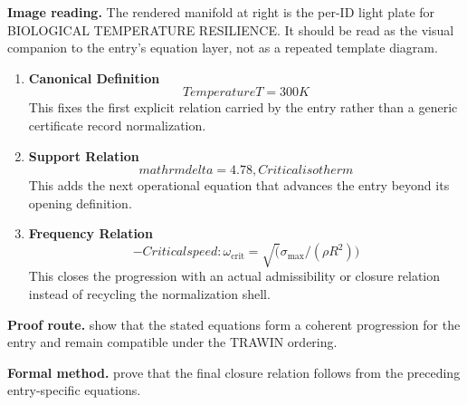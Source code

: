 \begin{samepage}
\noindent\begin{minipage}[t]{0.45\linewidth}
\vspace{0pt}
\raggedright
\scriptsize\textbf{Image reading.} The rendered manifold at right is the per-ID light plate for BIOLOGICAL TEMPERATURE RESILIENCE. It should be read as the visual companion to the entry's equation layer, not as a repeated template diagram.\par
\end{minipage}\hfill
\begin{minipage}[t]{0.53\linewidth}
\vspace*{-0.10in}
\raggedright
{}
\end{minipage}
\end{samepage}

\clearpage


\begin{enumerate}[leftmargin=1.6em,itemsep=9pt,topsep=6pt]
\item \textbf{Canonical Definition}
\[
Temperature T = 300K
\]
This fixes the first explicit relation carried by the entry rather than a generic certificate record normalization.

\item \textbf{Support Relation}
\[
mathrm{delta} = 4.78, Critical isotherm
\]
This adds the next operational equation that advances the entry beyond its opening definition.

\item \textbf{Frequency Relation}
\[
- Critical speed: \omega_{\mathrm{crit}} = \sqrt(\sigma_{\mathrm{max}}/(\rho R^{2}))
\]
This closes the progression with an actual admissibility or closure relation instead of recycling the normalization shell.
\end{enumerate}

\textbf{Proof route.} show that the stated equations form a coherent progression for the entry and remain compatible under the TRAWIN ordering.

\textbf{Formal method.} prove that the final closure relation follows from the preceding entry-specific equations.

\medskip
{}

